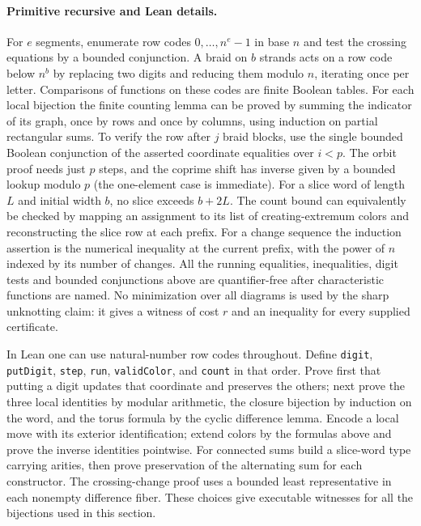 \paragraph{Primitive recursive and Lean details.}
For $e$ segments, enumerate row codes $0,\ldots,n^e-1$ in base $n$ and
test the crossing equations by a bounded conjunction. A braid on $b$
strands acts on a row code below $n^b$ by replacing two digits and
reducing them modulo $n$, iterating once per letter. Comparisons of
functions on these codes are finite Boolean tables. For each local
bijection the finite counting lemma can be proved by summing the
indicator of its graph, once by rows and once by columns, using induction
on partial rectangular sums. To verify the row after $j$ braid blocks,
use the single bounded Boolean conjunction of the asserted coordinate
equalities over $i<p$. The orbit proof needs just $p$ steps, and the
coprime shift has inverse given by a bounded lookup modulo $p$ (the
one-element case is immediate). For a slice word of length $L$ and initial
width $b$, no slice exceeds $b+2L$. The count bound can equivalently be
checked by mapping an assignment to its list of creating-extremum
colors and reconstructing the slice row at each prefix. For a change
sequence the induction assertion is the numerical inequality at the
current prefix, with the power of $n$ indexed by its number of changes.
All the running equalities, inequalities, digit tests and bounded
conjunctions above are quantifier-free after characteristic functions
are named. No minimization over all diagrams is used by the sharp
unknotting claim: it gives a witness of cost $r$ and an inequality for
every supplied certificate.

In Lean one can use natural-number row codes throughout. Define
\texttt{digit}, \texttt{putDigit}, \texttt{step}, \texttt{run},
\texttt{validColor}, and \texttt{count} in that order. Prove first that
putting a digit updates that coordinate and preserves the others; next
prove the three local identities by modular arithmetic, the closure
bijection by induction on the word, and the torus formula by the cyclic
difference lemma. Encode a local move with its exterior identification;
extend colors by the formulas above and prove the inverse identities
pointwise. For connected sums build a slice-word type carrying arities,
then prove preservation of the alternating sum for each constructor.
The crossing-change proof uses a bounded least representative in each
nonempty difference fiber. These choices give executable witnesses for
all the bijections used in this section.
